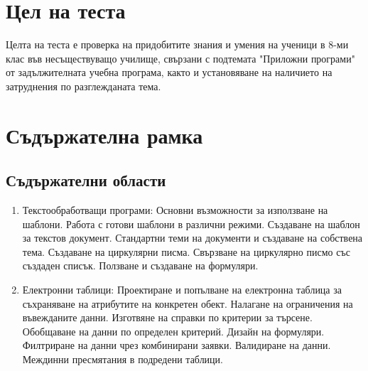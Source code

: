 \section{Цел на теста}

Целта на теста е проверка на придобитите знания и умения на ученици в 8-ми клас във несъществуващо училище, свързани с подтемата "Приложни програми" от задължителната учебна програма, както и установяване на наличието на затруднения по разглежданата тема.

\section{Съдържателна рамка}

\subsection{Съдържателни области}

\begin{enumerate}
    \item Текстообработващи програми:
          \subitem Основни възможности за използване на шаблони.
          \subitem Работа с готови шаблони в различни режими.
          \subitem Създаване на шаблон за текстов документ.
          \subitem Стандартни теми на документи и създаване на собствена тема.
          \subitem Създаване на циркулярни писма.
          \subitem Свързване на циркулярно писмо със създаден списък.
          \subitem Ползване и създаване на формуляри.
    \item Електронни таблици:
          \subitem Проектиране и попълване на електронна таблица за съхраняване на атрибутите на конкретен обект.
          \subitem Налагане на ограничения на въвежданите данни.
          \subitem Изготвяне на справки по критерии за търсене.
          \subitem Обобщаване на данни по определен критерий.
          \subitem Дизайн на формуляри.
          \subitem Филтриране на данни чрез комбинирани заявки.
          \subitem Валидиране на данни.
          \subitem Междинни пресмятания в подредени таблици.
\end{enumerate}


